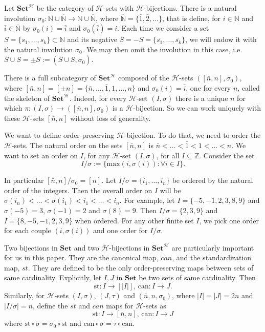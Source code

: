 \documentclass[11pt,reqno]{amsart}
\numberwithin{equation}{section}
\def\Na{{\mathbb N}}
\def\Z{{\mathbb Z}}
\def\Set{{\mathbf{Set}}}
\def\SetB{{\mathbf{Set}^{\H}}}
\def\H{{\mathcal{H}}}
\def\n{\bar{n},n}
\def\Is{(I,\sigma )}
\def\Jt{(J,\tau)}
\def\Im{I/\sigma}
\def\can{\mathrm{can}}
\def\st{\mathrm{st}}
\def\can{\mathrm{can}}
\begin{document}
Let $\SetB$ be the category of $\H$-sets with $\H$-bijections. There is a natural involution $\sigma_0\colon \Na\cup \overline{\Na}\rightarrow \Na\cup \overline{\Na}$, where $\overline{\Na}=\{\bar{1},\bar{2},\dots\}$, that is define, for $i\in\Na$ and $\bar{i}\in\overline{\Na}$ by $\sigma_0(i)=\bar{i}$ and $\sigma_0(\bar{i})=i$. Each time we consider a set $S=\{s_1,\dots,s_k\}\subset \Na$ and its negative $\overline{S}=-S=\{\overline{s_1},\dots,\overline{s_k}\}$, we will endow it with the natural involution $\sigma_0$. We may then omit the involution in this case, i.e. $\overline{S}\cup S=\pm S:=(\overline{S}\cup S,\sigma_0)$.

There is a full subcategory of $\SetB$ composed of the $\H$-sets $([\bar{n},n],\sigma_0)$, where $[\bar{n},n]=[\pm n]=\{\bar{n},\dots,\bar{1},1,\dots,n\}$ and $\sigma_0(i)=\bar{i}$, one for every $n$, called the skeleton of $\SetB$. Indeed, for every $\H$-set $(I,\sigma)$ there is a unique $n$ for which $\pi:(I,\sigma)\rightarrow ([\bar{n},n],\sigma_0)$ is a $\H$-bijection. So we can work uniquely with these $\H$-sets $[\n]$ without loss of generality.

We want to define order-preserving $\H$-bijection. To do that, we need to order the $\H$-sets. The natural order on the sets $[\bar{n},n]$ is $\bar{n}<\dots<\bar{1}<1<\dots <n$. We want to set an order on $I$, for any $\H$-set $(I,\sigma)$, for all $I\subseteq \Z$. Consider the set
\begin{equation}
\Im:=\{\mathrm{max}(i,\sigma(i)) : \forall i\in I\}.
\end{equation}

In particular $[\bar{n},n]/\sigma_0=[n]$. Let $I/\sigma=\{i_1,\dots, i_n\}$ be ordered by the natural order of the integers. Then the overall order on $I$ will be $\sigma(i_n)<\dots<\sigma(i_1)<i_1<\dots<i_n$. For example, let $I=\{-5,-1,2,3,8,9\}$ and $\sigma(-5)=3$, $\sigma(-1)=2$ and $\sigma(8)=9$. Then $I/\sigma=\{2,3,9\}$ and $I=\{8,-5,-1,2,3,9\}$ when ordered. For any other finite set $I$, we pick one order for each couple $(i,\sigma(i))$ and one order for $\Im$.

Two bijections in $\Set$ and two $\H$-bijections in $\SetB$ are particularly important for us in this paper. They are the canonical map, $can$, and the standardization map, $st$. They are defined to be the only order-preserving maps between sets of same cardinality. Explicitly, let $I,J$ in $\Set$ be two sets of same cardinality. Then $$\st\colon I\rightarrow [|I|],\,\can\colon I \rightarrow J.$$
Similarly, for $\H$-sets $\Is$, $\Jt$ and $(\n,\sigma_0)$, where $|I|=|J|=2n$ and $|I/\sigma|=n$, define the $st$ and $can$ maps for $\H$-sets as 
$$\st\colon I \rightarrow [\n],\,\can\colon I\rightarrow J$$
where $\st\circ\sigma=\sigma_0\circ\st$ and $\can\circ\sigma=\tau\circ\can$.
\end{document}
